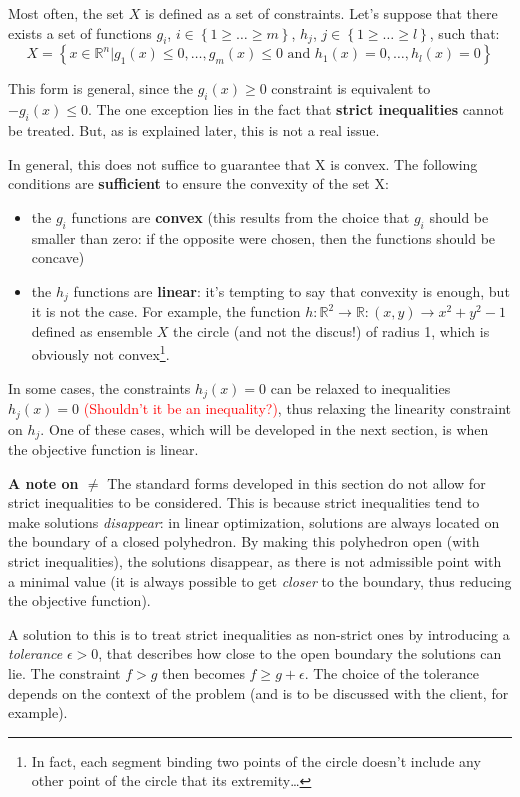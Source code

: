 Most often, the set $X$ is defined as a set of constraints. Let's suppose that there exists a set of functions $g_i$, $i \in \left\{1 \geq \dots \geq m \right\}$, $h_j$, $j \in \left\{ 1 \geq \dots \geq l \right\}$, such that:
$$X = \left\{ x \in \mathbb{R}^n | g_1(x) \leq 0, \dots, g_m(x) \leq 0 \text{ and } h_1(x)=0, \dots, h_l(x) = 0 \right\}$$

This form is general, since the $g_i(x) \geq 0$ constraint is equivalent to $-g_i(x) \leq 0$. The one exception lies in the fact that \textbf{strict inequalities} cannot be treated. But, as is explained later, this is not a real issue. 

In general, this does not suffice to guarantee that X is convex. The following conditions are \textbf{sufficient} to ensure the convexity of the set X:
\begin{itemize}
\item the $g_i$ functions are \textbf{convex} (this results from the choice that $g_i$ should be smaller than zero: if the opposite were chosen, then the functions should be concave)
\item the $h_j$ functions are \textbf{linear}: it's tempting to say that convexity is enough, but it is not the case. For example, the function $h:\mathbb{R}^2\rightarrow \mathbb{R}: (x,y) \rightarrow x^2+y^2 -1$ defined as ensemble $X$ the circle (and not the discus!) of radius 1, which is obviously not convex\footnote{In fact, each segment binding two points of the circle doesn't include any other point of the circle that its extremity\dots}.
\end{itemize}

In some cases, the constraints $h_j(x)=0$ can be relaxed to inequalities $h_j(x)=0$ \textcolor{red}{(Shouldn't it be an inequality?)}, thus relaxing the linearity constraint on $h_j$. One of these cases, which will be developed in the next section, is when the objective function is linear.


\begin{framed}\label{note_on_diff}
\textbf{A note on $\neq$} The standard forms developed in this section do not allow for strict inequalities to be considered. This is because strict inequalities tend to make solutions \textit{disappear}: in linear optimization, solutions are always located on the boundary of a closed polyhedron. By making this polyhedron open (with strict inequalities), the solutions disappear, as there is not admissible point with a minimal value (it is always possible to get \textit{closer} to the boundary, thus reducing the objective function).

A solution to this is to treat strict inequalities as non-strict ones by introducing a \textit{tolerance} $\epsilon > 0$, that describes how close to the open boundary the solutions can lie. The constraint $f>g$ then becomes $f \geq g+\epsilon$. The choice of the tolerance depends on the context of the problem (and is to be discussed with the client, for example).
\end{framed}

